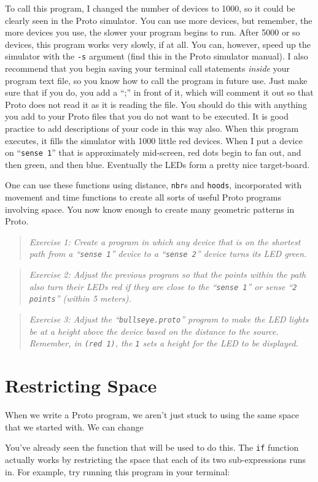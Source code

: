 \documentclass{article}
\newcommand\problem[1]{\begin{quote}{\em #1}\end{quote}}
\newcommand\var[1]{{\tt #1}}
\newcommand\qvar[1]{``{\tt #1}''}
\begin{document}
To call this program, I changed the number of devices to 1000, so it
could be clearly seen in the Proto simulator.  You can use more
devices, but remember, the more devices you use, the slower your
program begins to run.  After 5000 or so devices, this program works
very slowly, if at all.  You can, however, speed up the simulator with
the \var{-s} argument (find this in the Proto simulator manual).  I
also recommend that you begin saving your terminal call statements
{\em inside} your program text file, so you know how to call the
program in future use.  Just make sure that if you do, you add a “;”
in front of it, which will comment it out so that Proto does not read
it as it is reading the file.  You should do this with anything you
add to your Proto files that you do not want to be executed.  It is
good practice to add descriptions of your code in this way also.  When
this program executes, it fills the simulator with 1000 little red
devices.  When I put a device on \qvar{sense 1} that is approximately
mid-screen, red dots begin to fan out, and then green, and then blue.
Eventually the LEDs form a pretty nice target-board.

One can use these functions using distance, \var{nbr}s and
\var{hoods}, incorporated with movement and time functions to create
all sorts of useful Proto programs involving space.  You now know enough
to create many geometric patterns in Proto.

\problem{Exercise 1: Create a program in which any device that is on
  the shortest path from a \qvar{sense 1} device to a \qvar{sense 2}
  device turns its LED green.}

\problem{Exercise 2: Adjust the previous program so that the points
  within the path also turn their LEDs red if they are close to the
  \qvar{sense 1} or sense \qvar{2 points} (within 5 meters).}

\problem{Exercise 3: Adjust the \qvar{bullseye.proto} program to make
  the LED lights be at a height above the device based on the distance
  to the source. Remember, in \var{(red 1)}, the \var{1} sets a height
  for the LED to be displayed.}

\section{Restricting Space}

When we write a Proto program, we aren't just stuck to using the same
space that we started with.  We can change 

You've already seen the function that will be used to do this.  The
\var{if} function actually works by restricting the space that each of
its two sub-expressions runs in.  For example, try running this
program in your terminal:
\end{document}
